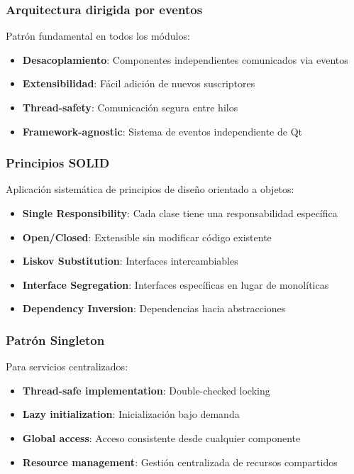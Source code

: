 \begin{itemize}
\subsubsection{Arquitectura dirigida por eventos}
Patrón fundamental en todos los módulos:

\begin{itemize}
    \item \textbf{Desacoplamiento}: Componentes independientes comunicados via eventos
    \item \textbf{Extensibilidad}: Fácil adición de nuevos suscriptores
    \item \textbf{Thread-safety}: Comunicación segura entre hilos
    \item \textbf{Framework-agnostic}: Sistema de eventos independiente de Qt
\end{itemize}

\subsubsection{Principios SOLID}
Aplicación sistemática de principios de diseño orientado a objetos:

\begin{itemize}
    \item \textbf{Single Responsibility}: Cada clase tiene una responsabilidad específica
    \item \textbf{Open/Closed}: Extensible sin modificar código existente
    \item \textbf{Liskov Substitution}: Interfaces intercambiables
    \item \textbf{Interface Segregation}: Interfaces específicas en lugar de monolíticas
    \item \textbf{Dependency Inversion}: Dependencias hacia abstracciones
\end{itemize}

\subsubsection{Patrón Singleton}
Para servicios centralizados:

\begin{itemize}
    \item \textbf{Thread-safe implementation}: Double-checked locking
    \item \textbf{Lazy initialization}: Inicialización bajo demanda
    \item \textbf{Global access}: Acceso consistente desde cualquier componente
    \item \textbf{Resource management}: Gestión centralizada de recursos compartidos
\end{itemize}


\end{itemize}
